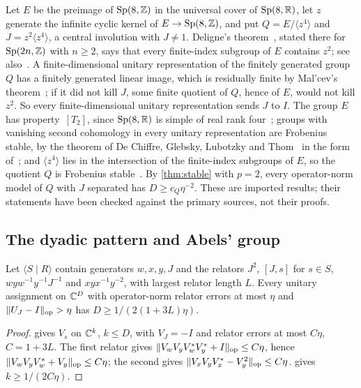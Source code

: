 \begin{example}\label{ex:deligne}
Let $E$ be the preimage of $\mathrm{Sp}(8,\mathbb Z)$ in the universal cover of $\mathrm{Sp}(8,\mathbb R)$, let $z$ generate the infinite cyclic
kernel of $E\to\mathrm{Sp}(8,\mathbb Z)$, and put $Q=E/\langle z^4\rangle$ and $J=z^2\langle z^4\rangle$, a central involution with $J\ne1$. Deligne's
theorem~\cite{Del78}, stated there for $\mathrm{Sp}(2n,\mathbb Z)$ with $n\ge2$, says that every finite-index subgroup of $E$ contains $z^2$;
see also~\cite{BCRR18}. A
finite-dimensional unitary representation of the finitely generated group $Q$ has a finitely generated linear image, which is
residually finite by Mal'cev's theorem~\cite{Mal40}; if it did not kill $J$, some finite quotient of $Q$, hence of $E$, would not kill
$z^2$. So every finite-dimensional unitary representation sends $J$ to $I$. The group $E$ has property~$[T_2]$, since
$\mathrm{Sp}(8,\mathbb R)$ is simple of real rank four~\cite[Theorem~2.10]{BLSW23}; groups with vanishing second cohomology in every unitary
representation are Frobenius stable, by the theorem of De Chiffre, Glebsky, Lubotzky and Thom~\cite{DGLT20} in the form
of~\cite[Theorem~1.1(F)]{BLSW23}; and $\langle z^4\rangle$ lies in the intersection of the finite-index
subgroups of $E$, so the quotient $Q$ is Frobenius stable~\cite[Lemma~2.12]{BLSW23}. By \cref{thm:stable} with $p=2$, every
operator-norm model of $Q$ with $J$ separated has $D\ge c_Q\eta^{-2}$. These are imported results; their statements have been checked
against the primary sources, not their proofs.
\end{example}

\subsection{The dyadic pattern and Abels' group}\label{app:floor-dyadic}

\begin{corollary}\label{cor:dyadic-models}
Let $\langle S\mid R\rangle$ contain generators $w,x,y,J$ and the relators $J^2$, $[J,s]$ for $s\in S$, $wyw^{-1}y^{-1}J^{-1}$ and
$xyx^{-1}y^{-2}$, with largest relator length $L$. Every unitary assignment on $\mathbb C^D$ with operator-norm relator errors at most
$\eta$ and $\lVert U_J-I\rVert_{\mathrm{op}}>\eta$ has $D\ge1/(2(1+3L)\eta)$.
\end{corollary}

\begin{proof}
 gives $V_s$ on $\mathbb C^k$, $k\le D$, with $V_J=-I$ and relator errors at most $C\eta$, $C=1+3L$. The first relator
gives $\lVert V_wV_yV_w^*V_y^*+I\rVert_{\mathrm{op}}\le C\eta$, hence $\lVert V_wV_yV_w^*+V_y\rVert_{\mathrm{op}}\le C\eta$; the second gives $\lVert V_xV_yV_x^*-V_y^2\rVert_{\mathrm{op}}\le C\eta$.
 gives $k\ge1/(2C\eta)$.
\end{proof}

